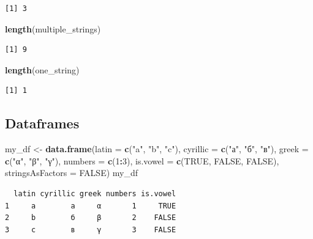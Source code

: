 \documentclass[]{book}
\newenvironment{Shaded}{\begin{snugshade}}{\end{snugshade}}
\newcommand{\KeywordTok}[1]{\textcolor[rgb]{0.13,0.29,0.53}{\textbf{#1}}}
\newcommand{\DataTypeTok}[1]{\textcolor[rgb]{0.13,0.29,0.53}{#1}}
\newcommand{\DecValTok}[1]{\textcolor[rgb]{0.00,0.00,0.81}{#1}}
\newcommand{\StringTok}[1]{\textcolor[rgb]{0.31,0.60,0.02}{#1}}
\newcommand{\OtherTok}[1]{\textcolor[rgb]{0.56,0.35,0.01}{#1}}
\newcommand{\OperatorTok}[1]{\textcolor[rgb]{0.81,0.36,0.00}{\textbf{#1}}}
\newcommand{\NormalTok}[1]{#1}
\theoremstyle{definition}
\theoremstyle{definition}
\theoremstyle{definition}
\theoremstyle{remark}
\begin{document}
\begin{verbatim}
[1] 3
\end{verbatim}

\begin{Shaded}
\begin{Highlighting}[]
\KeywordTok{length}\NormalTok{(multiple_strings)}
\end{Highlighting}
\end{Shaded}

\begin{verbatim}
[1] 9
\end{verbatim}

\begin{Shaded}
\begin{Highlighting}[]
\KeywordTok{length}\NormalTok{(one_string)}
\end{Highlighting}
\end{Shaded}

\begin{verbatim}
[1] 1
\end{verbatim}

\subsection{Dataframes}\label{dataframes}

\begin{Shaded}
\begin{Highlighting}[]
\NormalTok{my_df <-}\StringTok{ }\KeywordTok{data.frame}\NormalTok{(}\DataTypeTok{latin =} \KeywordTok{c}\NormalTok{(}\StringTok{"a"}\NormalTok{, }\StringTok{"b"}\NormalTok{, }\StringTok{"c"}\NormalTok{),}
                    \DataTypeTok{cyrillic =} \KeywordTok{c}\NormalTok{(}\StringTok{"а"}\NormalTok{, }\StringTok{"б"}\NormalTok{, }\StringTok{"в"}\NormalTok{),}
                    \DataTypeTok{greek =} \KeywordTok{c}\NormalTok{(}\StringTok{"α"}\NormalTok{, }\StringTok{"β"}\NormalTok{, }\StringTok{"γ"}\NormalTok{),}
                    \DataTypeTok{numbers =} \KeywordTok{c}\NormalTok{(}\DecValTok{1}\OperatorTok{:}\DecValTok{3}\NormalTok{),}
                    \DataTypeTok{is.vowel =} \KeywordTok{c}\NormalTok{(}\OtherTok{TRUE}\NormalTok{, }\OtherTok{FALSE}\NormalTok{, }\OtherTok{FALSE}\NormalTok{),}
                    \DataTypeTok{stringsAsFactors =} \OtherTok{FALSE}\NormalTok{)}
\NormalTok{my_df}
\end{Highlighting}
\end{Shaded}

\begin{verbatim}
  latin cyrillic greek numbers is.vowel
1     a        а     α       1     TRUE
2     b        б     β       2    FALSE
3     c        в     γ       3    FALSE
\end{verbatim}
\end{document}
